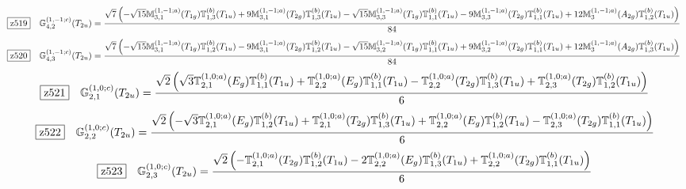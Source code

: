 \documentclass[fleqn,10pt,landscape]{jsarticle}
\begin{document}
\begin{dmath*}
\hspace*{3mm}\fbox{z519}\quad \mathbb{G}_{4,2}^{(1,-1;c)}(T_{2u})=\frac{\sqrt{7} \left(- \sqrt{15} \mathbb{M}_{3,1}^{(1,-1;a)}(T_{1g}) \mathbb{T}_{1,3}^{(b)}(T_{1u}) + 9 \mathbb{M}_{3,1}^{(1,-1;a)}(T_{2g}) \mathbb{T}_{1,3}^{(b)}(T_{1u}) - \sqrt{15} \mathbb{M}_{3,3}^{(1,-1;a)}(T_{1g}) \mathbb{T}_{1,1}^{(b)}(T_{1u}) - 9 \mathbb{M}_{3,3}^{(1,-1;a)}(T_{2g}) \mathbb{T}_{1,1}^{(b)}(T_{1u}) + 12 \mathbb{M}_{3}^{(1,-1;a)}(A_{2g}) \mathbb{T}_{1,2}^{(b)}(T_{1u})\right)}{84}
\end{dmath*}
\begin{dmath*}
\hspace*{3mm}\fbox{z520}\quad \mathbb{G}_{4,3}^{(1,-1;c)}(T_{2u})=\frac{\sqrt{7} \left(- \sqrt{15} \mathbb{M}_{3,1}^{(1,-1;a)}(T_{1g}) \mathbb{T}_{1,2}^{(b)}(T_{1u}) - 9 \mathbb{M}_{3,1}^{(1,-1;a)}(T_{2g}) \mathbb{T}_{1,2}^{(b)}(T_{1u}) - \sqrt{15} \mathbb{M}_{3,2}^{(1,-1;a)}(T_{1g}) \mathbb{T}_{1,1}^{(b)}(T_{1u}) + 9 \mathbb{M}_{3,2}^{(1,-1;a)}(T_{2g}) \mathbb{T}_{1,1}^{(b)}(T_{1u}) + 12 \mathbb{M}_{3}^{(1,-1;a)}(A_{2g}) \mathbb{T}_{1,3}^{(b)}(T_{1u})\right)}{84}
\end{dmath*}
\begin{dmath*}
\hspace*{3mm}\fbox{z521}\quad \mathbb{G}_{2,1}^{(1,0;c)}(T_{2u})=\frac{\sqrt{2} \left(\sqrt{3} \mathbb{T}_{2,1}^{(1,0;a)}(E_{g}) \mathbb{T}_{1,1}^{(b)}(T_{1u}) + \mathbb{T}_{2,2}^{(1,0;a)}(E_{g}) \mathbb{T}_{1,1}^{(b)}(T_{1u}) - \mathbb{T}_{2,2}^{(1,0;a)}(T_{2g}) \mathbb{T}_{1,3}^{(b)}(T_{1u}) + \mathbb{T}_{2,3}^{(1,0;a)}(T_{2g}) \mathbb{T}_{1,2}^{(b)}(T_{1u})\right)}{6}
\end{dmath*}
\begin{dmath*}
\hspace*{3mm}\fbox{z522}\quad \mathbb{G}_{2,2}^{(1,0;c)}(T_{2u})=\frac{\sqrt{2} \left(- \sqrt{3} \mathbb{T}_{2,1}^{(1,0;a)}(E_{g}) \mathbb{T}_{1,2}^{(b)}(T_{1u}) + \mathbb{T}_{2,1}^{(1,0;a)}(T_{2g}) \mathbb{T}_{1,3}^{(b)}(T_{1u}) + \mathbb{T}_{2,2}^{(1,0;a)}(E_{g}) \mathbb{T}_{1,2}^{(b)}(T_{1u}) - \mathbb{T}_{2,3}^{(1,0;a)}(T_{2g}) \mathbb{T}_{1,1}^{(b)}(T_{1u})\right)}{6}
\end{dmath*}
\begin{dmath*}
\hspace*{3mm}\fbox{z523}\quad \mathbb{G}_{2,3}^{(1,0;c)}(T_{2u})=\frac{\sqrt{2} \left(- \mathbb{T}_{2,1}^{(1,0;a)}(T_{2g}) \mathbb{T}_{1,2}^{(b)}(T_{1u}) - 2 \mathbb{T}_{2,2}^{(1,0;a)}(E_{g}) \mathbb{T}_{1,3}^{(b)}(T_{1u}) + \mathbb{T}_{2,2}^{(1,0;a)}(T_{2g}) \mathbb{T}_{1,1}^{(b)}(T_{1u})\right)}{6}
\end{dmath*}
\end{document}
